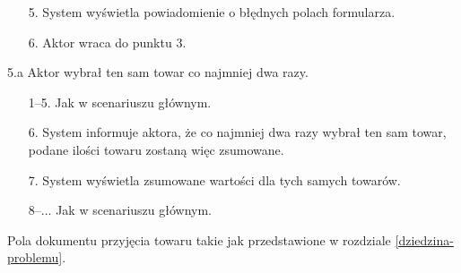 \begin{usecase}
{\begin{enumerate}
        \item[5.] System wyświetla powiadomienie o błędnych polach formularza.
        \item[6.] Aktor wraca do punktu 3.
      \end{enumerate}
     \item[5.a] Aktor wybrał ten sam towar co najmniej dwa razy.
       \begin{enumerate}
       \item[1--5.] Jak w scenariuszu głównym.
       \item[6.] System informuje aktora, że co najmniej dwa razy wybrał ten sam towar, podane ilości towaru zostaną więc zsumowane.
       \item[7.] System wyświetla zsumowane wartości dla tych samych towarów.
       \item[8--...] Jak w scenariuszu głównym.
       \end{enumerate}
  }
   {
    Pola dokumentu przyjęcia towaru takie jak przedstawione w rozdziale \ref{dziedzina-problemu}.
  }
\end{usecase}

